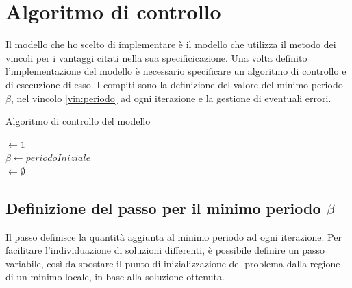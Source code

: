 \documentclass[a4paper,12pt]{report}
\begin{document}
\section{Algoritmo di controllo}
\label{ss:controllo}
Il modello che ho scelto di implementare è il modello che utilizza il metodo dei vincoli per i vantaggi citati nella sua specificicazione. Una volta definito l'implementazione del modello è necessario specificare un algoritmo di controllo e di esecuzione di esso. I compiti sono la definizione del valore del minimo periodo $ \beta $, nel vincolo \eqref{vin:periodo} ad ogni iterazione e la gestione di eventuali errori.



\begin{algorithm}
  \caption{Algoritmo di controllo del modello}
  \label{controllo}

  \BlankLine
  \BlankLine

  \Passo $\leftarrow 1$ \\
  $\beta \leftarrow periodoIniziale$ \\
  \Soluzioni $\leftarrow \emptyset$ \\


\end{algorithm}

\subsection{Definizione del passo per il minimo periodo $\beta$}
\label{ss:passo}
Il passo definisce la quantità aggiunta al minimo periodo ad ogni iterazione.
Per facilitare l'individuazione di soluzioni differenti, è possibile definire un passo variabile, così da spostare il punto di inizializzazione del problema dalla regione di un minimo locale, in base alla soluzione ottenuta.
\end{document}
